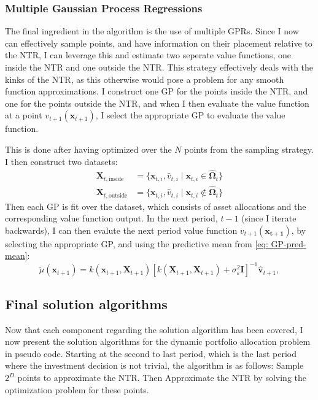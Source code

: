 \documentclass[11pt]{article}
\begin{document}
\subsubsection{Multiple Gaussian Process Regressions} \label{Subsubsection: NTR-GPR}
The final ingredient in the algorithm is the use of multiple \ac{GPR}s.
Since I now can effectively sample points, and have information on their placement relative to the \ac{NTR},
I can leverage this and estimate two seperate value functions, one inside the \ac{NTR} and one outside the \ac{NTR}.
This strategy effectively deals with the kinks of the \ac{NTR}, as this otherwise would pose a problem for any smooth function approximations.
I construct one \ac{GP} for the points inside the \ac{NTR}, and one for the points outside the \ac{NTR}, and when I then evaluate the value function at a point $v_{t+1}(\mathbf{x}_{t+1})$,
I select the appropriate \ac{GP} to evaluate the value function.

This is done after having optimized over the $N$ points from the sampling strategy. I then construct two datasets:
\begin{align}
  \mathbf{X}_{t,\text{inside}} &= \{ \mathbf{x}_{t,i} , \hat{v}_{t,i} \mid \mathbf{x}_{t,i} \in \hat{\boldsymbol{\Omega}}_{t} \}\\
  \mathbf{X}_{t,\text{outside}} &= \{ \mathbf{x}_{t,i} , \hat{v}_{t,i} \mid \mathbf{x}_{t,i} \notin \hat{\boldsymbol{\Omega}}_{t} \}
\end{align}
Then each \ac{GP} is fit over the dataset, which consists of asset allocations and the corresponding value function output.
In the next period, $t-1$ (since I iterate backwards), I can then evalute the next period value function $v_{t+1}(\mathbf{x_{t+1}})$,
by selecting the appropriate \ac{GP}, and using the predictive mean from \eqref{eq: GP-pred-mean}:
\begin{equation} \label{eq: valuefunctin_gp_mean}
  \tilde{\mu}(\mathbf{x}_{t+1}) = k(\mathbf{x}_{t+1}, \mathbf{X}_{t+1}) [k(\mathbf{X}_{t+1}, \mathbf{X}_{t+1}) + \sigma^{2}_{\varepsilon} \mathbf{I}]^{-1} \hat{\mathbf{v}}_{t+1},
\end{equation}
\subsection{Final solution algorithms} \label{Subsection: Algorithm}
Now that each component regarding the solution algorithm has been covered, I now present the solution algorithms for the dynamic portfolio allocation problem in pseudo code.
Starting at the second to last period, which is the last period where the investment decision is not trivial, the algorithm is as follows:
Sample $2^{D}$ points to approximate the \ac{NTR}. Then Approximate the \ac{NTR} by solving the optimization problem for these points.
\end{document}
